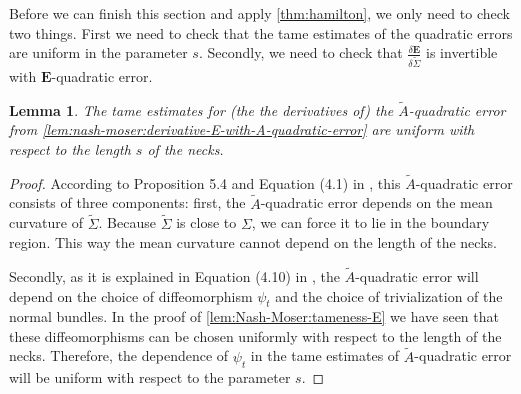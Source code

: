\documentclass[preprint,12pt]{elsarticle}
\numberwithin{table}{section}
\newtheorem{lemma}{Lemma}[section]
\begin{document}
Before we can finish this section and apply \cref{thm:hamilton}, we only need to check two things. First we need to check that the tame estimates of the quadratic errors are uniform in the parameter $s$. Secondly, we need to check that $\frac{\delta \mathbf{E}}{\delta \tilde \Sigma}$ is invertible with $\mathbf{E}$-quadratic error. 

\begin{lemma}
	\label{lem:Nash-Moser:quadratic-error}
	The tame estimates for (the the derivatives of) the $\tilde A$-quadratic error from \cref{lem:nash-moser:derivative-E-with-A-quadratic-error} are uniform with respect to the length $s$ of the necks.
\end{lemma}
\begin{proof}
	According to Proposition 5.4 and Equation (4.1) in \cite{Donaldson2021}, this $\tilde A$-quadratic error consists of three components: first, the $\tilde A$-quadratic error depends on the mean curvature of $\tilde \Sigma$. Because $\tilde \Sigma$ is close to $\Sigma$, we can force it to lie in the boundary region.  This way the mean curvature cannot depend on the length of the necks. 

	Secondly, as it is explained in Equation (4.10) in \cite{Donaldson2021}, the $\tilde A$-quadratic error will depend on the choice of diffeomorphism $\psi_t$ and the choice of trivialization of the normal bundles. In the proof of \cref{lem:Nash-Moser:tameness-E} we have seen that these diffeomorphisms can be chosen uniformly with respect to the length of the necks. Therefore, the dependence of $\psi_t$ in the tame estimates of $\tilde A$-quadratic error will be uniform with respect to the parameter $s$.


\end{proof}
\end{document}
